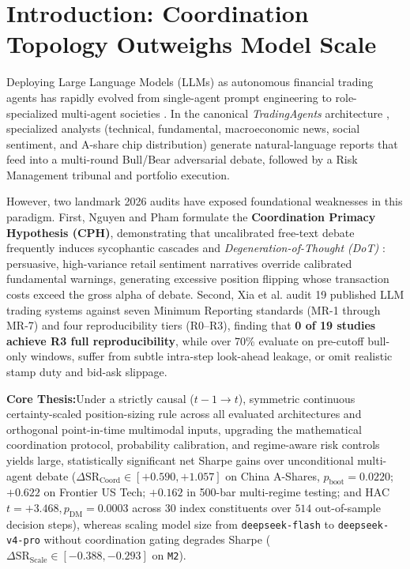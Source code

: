 \documentclass[10pt,a4paper,twocolumn]{article}
\newcommand{\takeaway}[2]{%
  \vspace{3pt}\noindent\colorbox{lightbg}{%
    \parbox{\dimexpr\columnwidth-2\fboxsep\relax}{%
      \vspace{2pt}\textbf{\color{primary}#1:}\hspace{0.4em}#2\vspace{2pt}%
    }%
  }\vspace{3pt}%
}
\begin{document}
\begin{abstract}
from \texttt{deepseek-flash} to \texttt{deepseek-v4-pro} without coordination gating yields negative Sharpe differentials ($\Delta\text{SR}_{\text{Scale}} \in [-0.388, -0.293]$ on \texttt{M2}), empirically confirming the \textbf{Coordination Primacy Hypothesis}.
\end{abstract}

\section{Introduction: Coordination Topology Outweighs Model Scale}

Deploying Large Language Models (LLMs) as autonomous financial trading agents has rapidly evolved from single-agent prompt engineering to role-specialized multi-agent societies \cite{xiao2024tradingagents,yu2024fincon,li2024hedgeagents}. In the canonical \textit{TradingAgents} architecture \cite{xiao2024tradingagents}, specialized analysts (technical, fundamental, macroeconomic news, social sentiment, and A-share chip distribution) generate natural-language reports that feed into a multi-round Bull/Bear adversarial debate, followed by a Risk Management tribunal and portfolio execution.

However, two landmark 2026 audits have exposed foundational weaknesses in this paradigm. First, Nguyen and Pham \cite{nguyen2026cph} formulate the \textbf{Coordination Primacy Hypothesis (CPH)}, demonstrating that uncalibrated free-text debate frequently induces sycophantic cascades and \textit{Degeneration-of-Thought (DoT)} \cite{liang2023dot,du2023debate}: persuasive, high-variance retail sentiment narratives override calibrated fundamental warnings, generating excessive position flipping whose transaction costs exceed the gross alpha of debate. Second, Xia et al. \cite{xia2026audit} audit 19 published LLM trading systems against seven Minimum Reporting standards (MR-1 through MR-7) and four reproducibility tiers (R0--R3), finding that \textbf{0 of 19 studies achieve R3 full reproducibility}, while over 70\% evaluate on pre-cutoff bull-only windows, suffer from subtle intra-step look-ahead leakage, or omit realistic stamp duty and bid-ask slippage.

\takeaway{Core Thesis}{Under a strictly causal ($t-1 \to t$), symmetric continuous certainty-scaled position-sizing rule across all evaluated architectures and orthogonal point-in-time multimodal inputs, upgrading the mathematical coordination protocol, probability calibration, and regime-aware risk controls yields large, statistically significant net Sharpe gains over unconditional multi-agent debate ($\Delta\text{SR}_{\text{Coord}} \in [+0.590, +1.057]$ on China A-Shares, $p_{\text{boot}} = 0.0220$; $+0.622$ on Frontier US Tech; $+0.162$ in 500-bar multi-regime testing; and HAC $t = +3.468, p_{\text{DM}} = 0.0003$ across 30 index constituents over $514$ out-of-sample decision steps), whereas scaling model size from \texttt{deepseek-flash} to \texttt{deepseek-v4-pro} without coordination gating degrades Sharpe ($\Delta\text{SR}_{\text{Scale}} \in [-0.388, -0.293]$ on \texttt{M2}).}
\end{document}
